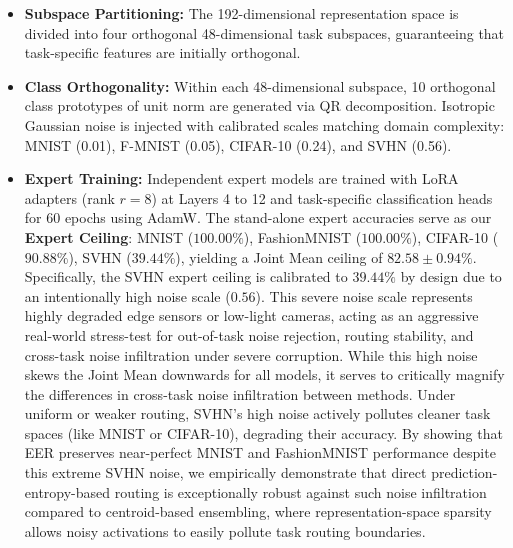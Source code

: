 \begin{itemize}
    \item \textbf{Subspace Partitioning:} The 192-dimensional representation space is divided into four orthogonal 48-dimensional task subspaces, guaranteeing that task-specific features are initially orthogonal.
    \item \textbf{Class Orthogonality:} Within each 48-dimensional subspace, 10 orthogonal class prototypes of unit norm are generated via QR decomposition. Isotropic Gaussian noise is injected with calibrated scales matching domain complexity: MNIST (0.01), F-MNIST (0.05), CIFAR-10 (0.24), and SVHN (0.56).
    \item \textbf{Expert Training:} Independent expert models are trained with LoRA adapters (rank $r=8$) at Layers 4 to 12 and task-specific classification heads for 60 epochs using AdamW. The stand-alone expert accuracies serve as our \textbf{Expert Ceiling}:
    MNIST ($100.00\%$), FashionMNIST ($100.00\%$), CIFAR-10 ($90.88\%$), SVHN ($39.44\%$), yielding a Joint Mean ceiling of \textbf{$82.58 \pm 0.94\%$}. Specifically, the SVHN expert ceiling is calibrated to $39.44\%$ by design due to an intentionally high noise scale ($0.56$). This severe noise scale represents highly degraded edge sensors or low-light cameras, acting as an aggressive real-world stress-test for out-of-task noise rejection, routing stability, and cross-task noise infiltration under severe corruption. While this high noise skews the Joint Mean downwards for all models, it serves to critically magnify the differences in cross-task noise infiltration between methods. Under uniform or weaker routing, SVHN's high noise actively pollutes cleaner task spaces (like MNIST or CIFAR-10), degrading their accuracy. By showing that EER preserves near-perfect MNIST and FashionMNIST performance despite this extreme SVHN noise, we empirically demonstrate that direct prediction-entropy-based routing is exceptionally robust against such noise infiltration compared to centroid-based ensembling, where representation-space sparsity allows noisy activations to easily pollute task routing boundaries.

\end{itemize}
